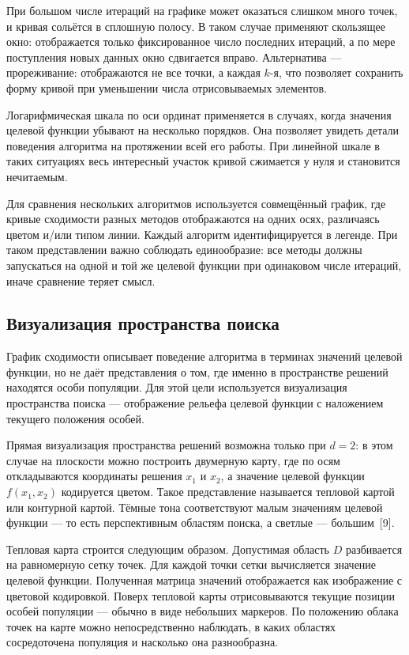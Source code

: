 \documentclass[14pt, russian]{scrartcl}
\begin{document}
При большом числе итераций на графике может оказаться слишком много
точек, и кривая сольётся в сплошную полосу. В таком случае применяют
скользящее окно: отображается только фиксированное число последних
итераций, а по мере поступления новых данных окно сдвигается вправо.
Альтернатива --- прореживание: отображаются не все точки, а каждая
$k$-я, что позволяет сохранить форму кривой при уменьшении числа
отрисовываемых элементов.

Логарифмическая шкала по оси ординат применяется в случаях, когда
значения целевой функции убывают на несколько порядков. Она позволяет
увидеть детали поведения алгоритма на протяжении всей его работы. 
При линейной шкале в таких ситуациях весь интересный участок кривой 
сжимается у нуля и становится нечитаемым.

Для сравнения нескольких алгоритмов используется совмещённый график,
где кривые сходимости разных методов отображаются на одних осях,
различаясь цветом и/или типом линии. Каждый алгоритм идентифицируется
в легенде. При таком представлении важно соблюдать единообразие: все
методы должны запускаться на одной и той же целевой функции при одинаковом
числе итераций, иначе сравнение теряет смысл.

\subsection{Визуализация пространства поиска}

График сходимости описывает поведение алгоритма в терминах значений
целевой функции, но не даёт представления о том, где именно в пространстве
решений находятся особи популяции. Для этой цели используется визуализация
пространства поиска --- отображение рельефа целевой функции с наложением
текущего положения особей.

Прямая визуализация пространства решений возможна только при $d = 2$:
в этом случае на плоскости можно построить двумерную карту, где по осям
откладываются координаты решения $x_1$ и $x_2$, а значение целевой
функции $f(x_1, x_2)$ кодируется цветом. Такое представление называется
тепловой картой или контурной картой. Тёмные
тона соответствуют малым значениям целевой функции --- то есть
перспективным областям поиска, а светлые --- большим~[9].

Тепловая карта строится следующим образом. Допустимая область $D$
разбивается на равномерную сетку точек. Для каждой точки сетки
вычисляется значение целевой функции. Полученная матрица значений
отображается как изображение с цветовой кодировкой. Поверх тепловой
карты отрисовываются текущие позиции особей популяции --- обычно в виде
небольших маркеров. По положению облака точек на карте можно
непосредственно наблюдать, в каких областях сосредоточена популяция и
насколько она разнообразна.
\end{document}
